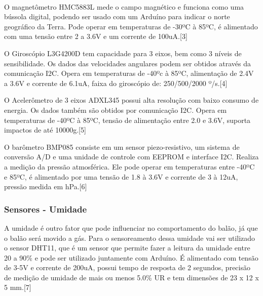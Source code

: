 \indent
\\\par
O magnetômetro HMC5883L mede o campo magnético e funciona como uma bússola digital, podendo ser usado com um Arduíno para indicar o norte geográfico da Terra. Pode operar em temperaturas de -30ºC à 85ºC, é alimentado com uma tensão entre 2 a 3.6V e um corrente de 100uA.[3]

\indent
\par
O Giroscópio L3G4200D tem capacidade para 3 eixos, bem como 3 níveis de sensibilidade. Os dados das velocidades angulares podem ser obtidos através da comunicação I2C. Opera em temperaturas de -40ºc à 85ºC, alimentação de 2.4V a 3.6V e corrente de 6.1uA, faixa do giroscópio de: 250/500/2000 º/s.[4]

\indent
\par
O Acelerômetro de 3 eixos ADXL345 possui alta resolução com baixo consumo de energia. Os dados também são obtidos por comunicação I2C. Opera em temperaturas de -40ºC à 85ºC, tensão de alimentação entre 2.0 e 3.6V, suporta impactos de até 10000g.[5]

\indent
\par
O barômetro BMP085 consiste em um sensor piezo-resistivo, um sistema de conversão A/D e uma unidade de controle com EEPROM e interface I2C. Realiza a medição da pressão atmosférica. Ele pode operar em temperaturas entre -40ºC e 85ºC, é alimentado por uma tensão de 1.8 à 3.6V e corrente de 3 à 12uA, pressão medida em hPa.[6]

\subsubsection{Sensores - Umidade}
\indent
\par
A umidade é outro fator que pode influenciar no comportamento do balão, já que o balão será movido a gás. Para o sensoreamento dessa umidade vai ser utilizado o sensor DHT11, que é um sensor que permite fazer a leitura da umidade entre 20 a 90\% e pode ser utilizado juntamente com Arduíno. É alimentado com tensão de 3-5V e corrente de 200uA, possui tempo de resposta de 2 segundos, precisão de medição de umidade de mais ou menos 5.0\% UR e tem dimensões de 23 x 12 x 5 mm.[7]
\\
